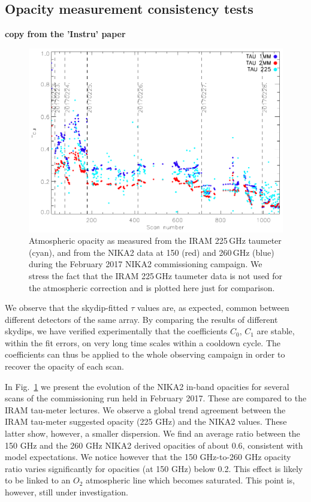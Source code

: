 \subsection{Opacity measurement consistency tests}

{\bf copy from the 'Instru' paper}

\begin{figure}
\includegraphics[scale=0.75]{../../Paper_NIKA2_Technical/opacity_evol_run22.pdf}
\caption{Atmospheric opacity as measured from the IRAM 225\,GHz taumeter (cyan), and from the NIKA2 data at 150 (red) and 260\,GHz (blue) during the February 2017 NIKA2 commissioning campaign. We stress the fact that the IRAM 225\,GHz taumeter data is not used for the atmospheric correction and is plotted here just for comparison.
  \label{fig:taumeas}}
\end{figure}

We observe that the skydip-fitted $\tau$ values are, as expected,
common between different detectors of the same array. By comparing
the results of different skydips, we have verified experimentally
that the coefficients $C_0$, $C_1$ are stable, within the fit
errors, on very long time scales within a cooldown cycle. The
coefficients can thus be applied to the whole observing campaign
in order to recover the opacity of each scan.

In Fig.~\ref{fig:taumeas} we present the evolution of the NIKA2 in-band opacities for several
scans of the commissioning run held in February 2017. These are
compared to the IRAM tau-meter lectures. We observe a global
trend agreement between the IRAM tau-meter suggested opacity
(225 GHz) and the NIKA2 values. These latter show, however,
a smaller dispersion. We find an average ratio between the
150 GHz and the 260 GHz NIKA2 derived opacities of about
0.6, consistent with model expectations. We notice however that
the 150 GHz-to-260 GHz opacity ratio varies significantly for
opacities (at 150 GHz) below 0.2. This effect is likely to be
linked to an $O_2$ atmospheric line which becomes saturated. This
point is, however, still under investigation.


